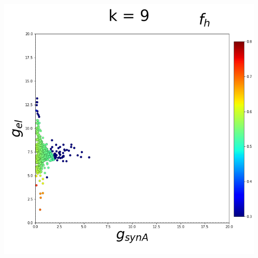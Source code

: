 \documentclass[11pt]{article}
\begin{document}
\begin{center}
\includegraphics[scale=0.125]{DSN_figs/STGCircuit_DSN_c=2_rs=4_k=9.png}
\end{center}



\end{document}
